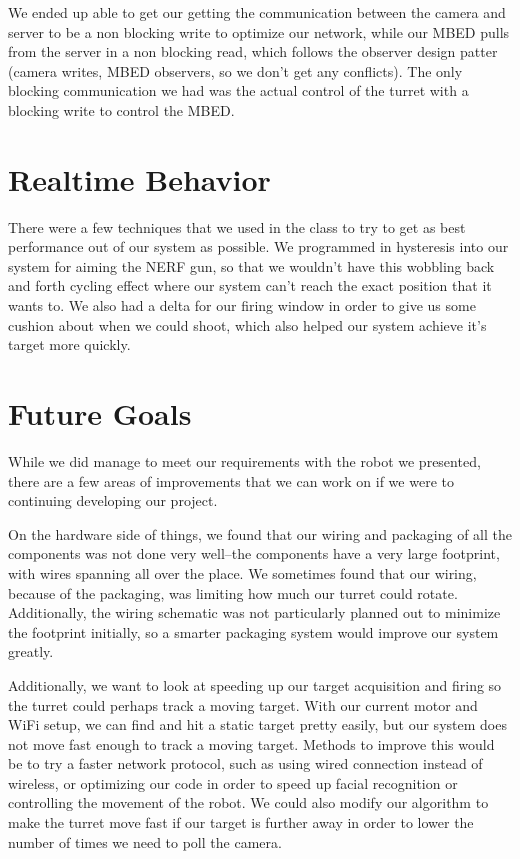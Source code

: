 \documentclass[journal]{IEEEtran}
\begin{document}
We ended up able to get our getting the communication between the camera and server to be a non blocking write to optimize our network, while our MBED pulls from the server in a non blocking read, which follows the observer design patter (camera writes, MBED observers, so we don't get any conflicts). The only blocking communication we had was the actual control of the turret with a blocking write to control the MBED.



\section{Realtime Behavior}
There were a few techniques that we used in the class to try to get as best performance out of our system as possible. We programmed in hysteresis into our system for aiming the NERF gun, so that we wouldn't have this wobbling back and forth cycling effect where our system can't reach the exact position that it wants to. We also had a delta for our firing window in order to give us some cushion about when we could shoot, which also helped our system achieve it's target more quickly.

\section{Future Goals}

While we did manage to meet our requirements with the robot we presented, there are a few areas of improvements that we can work on if we were to continuing developing our project.

On the hardware side of things, we found that our wiring and packaging of all the components was not done very well--the components have a very large footprint, with wires spanning all over the place. We sometimes found that our wiring, because of the packaging, was limiting how much our turret could rotate. Additionally, the wiring schematic was not particularly planned out to minimize the footprint initially, so a smarter packaging system would improve our system greatly.

Additionally, we want to look at speeding up our target acquisition and firing so the turret could perhaps track a moving target. With our current motor and WiFi setup, we can find and hit a static target pretty easily, but our system does not move fast enough to track a moving target. Methods to improve this would be to try a faster network protocol, such as using wired connection instead of wireless, or optimizing our code in order to speed up facial recognition or controlling the movement of the robot. We could also modify our algorithm to make the turret move fast if our target is further away in order to lower the number of times we need to poll the camera.


\nocite{*}



\end{document}
